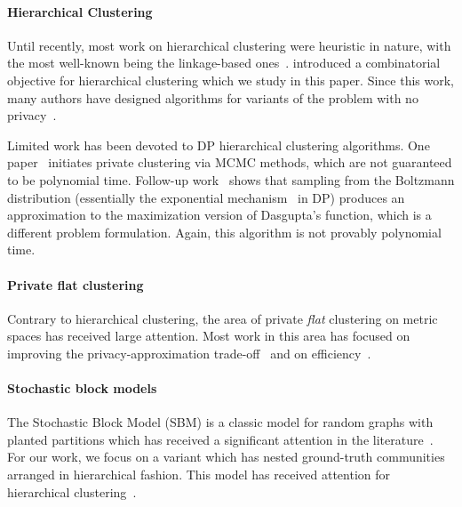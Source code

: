 \paragraph{Hierarchical Clustering}
Until recently, most work on hierarchical clustering were heuristic in nature, with the most well-known being the linkage-based ones~\citep{J10,bateni2017affinity}. \citet{dasgupta2016cost} introduced a combinatorial objective for hierarchical clustering which we study in this paper. Since this work, many authors have designed algorithms for variants of the problem with no privacy~\citep{cohen2017hierarchical,cohen2019hierarchical, charikar2017approximate,moseley2017approximation, agarwal2022sublinear,chatziafratis2020bisect}.

Limited work has been devoted to DP hierarchical clustering algorithms. One paper~\citep{xiao2014differentially} initiates private clustering via MCMC methods, which are not guaranteed to be polynomial time. Follow-up work~\citep{Kolluri_CCS21} shows that sampling from the Boltzmann distribution (essentially the exponential mechanism~\citep{mcsherry2007mechanism} in DP) produces an approximation to the maximization version of Dasgupta's function, which is a different problem formulation. Again, this algorithm is not provably polynomial time.

\paragraph{Private flat clustering}
Contrary to hierarchical clustering, the area of private {\it flat} clustering on metric spaces has received large attention. Most work in this area has focused on improving the privacy-approximation trade-off~\citep{ghazi2020differentially,balcan2017differentially} and on efficiency~\citep{hegde2021sok,cohennear,cohen2022scalable}.

\paragraph{Stochastic block models}

The Stochastic Block Model (SBM) is a classic model for random graphs with planted partitions which has received a significant attention in the literature~\citep{MR3520025-Guedon16,montanari2016semidefinite, moitra2016robust,MR4115142,ding2022robust,Liu-Moitra-minimax}. For our work, we focus on a variant which has nested ground-truth communities arranged in hierarchical fashion. This model has received attention for hierarchical clustering~\citep{cohen2017hierarchical}.   

